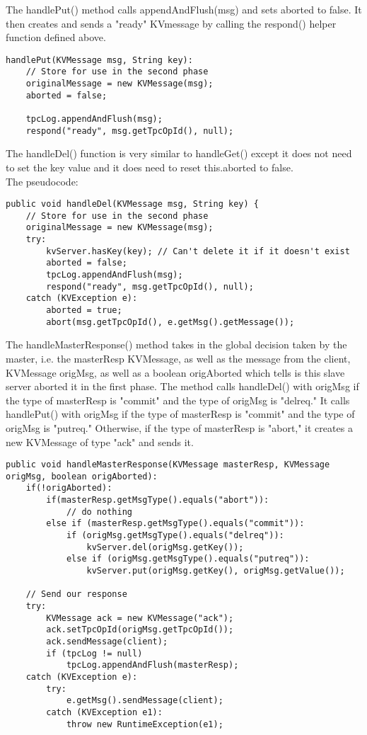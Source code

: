 \documentclass{article}
\begin{document}
The handlePut() method calls appendAndFlush(msg) and sets aborted to false. It then creates and sends a "ready" KVmessage by calling the respond() helper function defined above.\\
\begin{verbatim}
handlePut(KVMessage msg, String key):
    // Store for use in the second phase
    originalMessage = new KVMessage(msg);
    aborted = false;

    tpcLog.appendAndFlush(msg);
    respond("ready", msg.getTpcOpId(), null);
\end{verbatim}

The handleDel() function is very similar to handleGet() except it does not need to set the key value and it does need to reset this.aborted to false.\\
The pseudocode:

\begin{verbatim}
public void handleDel(KVMessage msg, String key) {
    // Store for use in the second phase
    originalMessage = new KVMessage(msg);
    try:
        kvServer.hasKey(key); // Can't delete it if it doesn't exist
        aborted = false;
        tpcLog.appendAndFlush(msg);
        respond("ready", msg.getTpcOpId(), null);
    catch (KVException e):
        aborted = true;
        abort(msg.getTpcOpId(), e.getMsg().getMessage());
\end{verbatim}

The handleMasterResponse() method takes in the global decision taken by the master, i.e. the masterResp KVMessage, as
well as the message from the client, KVMessage origMsg, as well as a boolean origAborted which tells is this slave
server aborted it in the first phase.
The method calls handleDel() with origMsg if the type of masterResp is "commit" and the type of origMsg is "delreq."
It calls handlePut() with origMsg if the type of masterResp is "commit" and the type of origMsg is "putreq." 
Otherwise, if the type of masterResp is "abort," it creates a new KVMessage of type "ack" and sends it.
\begin{verbatim}
public void handleMasterResponse(KVMessage masterResp, KVMessage origMsg, boolean origAborted):
    if(!origAborted):
        if(masterResp.getMsgType().equals("abort")):
            // do nothing
        else if (masterResp.getMsgType().equals("commit")):
            if (origMsg.getMsgType().equals("delreq")):
                kvServer.del(origMsg.getKey());
            else if (origMsg.getMsgType().equals("putreq")):
                kvServer.put(origMsg.getKey(), origMsg.getValue());

    // Send our response
    try:
        KVMessage ack = new KVMessage("ack");
        ack.setTpcOpId(origMsg.getTpcOpId());
        ack.sendMessage(client);
        if (tpcLog != null)
            tpcLog.appendAndFlush(masterResp);
    catch (KVException e):
        try:
            e.getMsg().sendMessage(client);
        catch (KVException e1):
            throw new RuntimeException(e1);
\end{verbatim}
\end{document}
